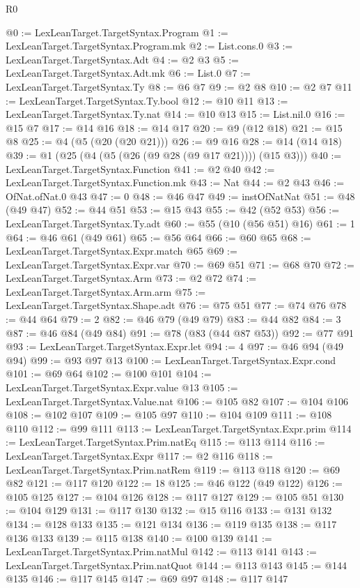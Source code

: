\begin{lexlean}{R0}
\begin{coremodule}
@0 := LexLeanTarget.TargetSyntax.Program
@1 := LexLeanTarget.TargetSyntax.Program.mk
@2 := List.cons.{0}
@3 := LexLeanTarget.TargetSyntax.Adt
@4 := @2 @3
@5 := LexLeanTarget.TargetSyntax.Adt.mk
@6 := List.{0}
@7 := LexLeanTarget.TargetSyntax.Ty
@8 := @6 @7
@9 := @2 @8
@10 := @2 @7
@11 := LexLeanTarget.TargetSyntax.Ty.bool
@12 := @10 @11
@13 := LexLeanTarget.TargetSyntax.Ty.nat
@14 := @10 @13
@15 := List.nil.{0}
@16 := @15 @7
@17 := @14 @16
@18 := @14 @17
@20 := @9 (@12 @18)
@21 := @15 @8
@25 := @4 (@5 (@20 (@20 @21)))
@26 := @9 @16
@28 := @14 (@14 @18)
@39 := @1 (@25 (@4 (@5 (@26 (@9 @28 (@9 @17 @21)))) (@15 @3)))
@40 := LexLeanTarget.TargetSyntax.Function
@41 := @2 @40
@42 := LexLeanTarget.TargetSyntax.Function.mk
@43 := Nat
@44 := @2 @43
@46 := OfNat.ofNat.{0} @43
@47 := 0
@48 := @46 @47
@49 := instOfNatNat
@51 := @48 (@49 @47)
@52 := @44 @51
@53 := @15 @43
@55 := @42 (@52 @53)
@56 := LexLeanTarget.TargetSyntax.Ty.adt
@60 := @55 (@10 (@56 @51) @16)
@61 := 1
@64 := @46 @61 (@49 @61)
@65 := @56 @64
@66 := @60 @65
@68 := LexLeanTarget.TargetSyntax.Expr.match @65
@69 := LexLeanTarget.TargetSyntax.Expr.var
@70 := @69 @51
@71 := @68 @70
@72 := LexLeanTarget.TargetSyntax.Arm
@73 := @2 @72
@74 := LexLeanTarget.TargetSyntax.Arm.arm
@75 := LexLeanTarget.TargetSyntax.Shape.adt
@76 := @75 @51
@77 := @74 @76
@78 := @44 @64
@79 := 2
@82 := @46 @79 (@49 @79)
@83 := @44 @82
@84 := 3
@87 := @46 @84 (@49 @84)
@91 := @78 (@83 (@44 @87 @53))
@92 := @77 @91
@93 := LexLeanTarget.TargetSyntax.Expr.let
@94 := 4
@97 := @46 @94 (@49 @94)
@99 := @93 @97 @13
@100 := LexLeanTarget.TargetSyntax.Expr.cond
@101 := @69 @64
@102 := @100 @101
@104 := LexLeanTarget.TargetSyntax.Expr.value @13
@105 := LexLeanTarget.TargetSyntax.Value.nat
@106 := @105 @82
@107 := @104 @106
@108 := @102 @107
@109 := @105 @97
@110 := @104 @109
@111 := @108 @110
@112 := @99 @111
@113 := LexLeanTarget.TargetSyntax.Expr.prim
@114 := LexLeanTarget.TargetSyntax.Prim.natEq
@115 := @113 @114
@116 := LexLeanTarget.TargetSyntax.Expr
@117 := @2 @116
@118 := LexLeanTarget.TargetSyntax.Prim.natRem
@119 := @113 @118
@120 := @69 @82
@121 := @117 @120
@122 := 18
@125 := @46 @122 (@49 @122)
@126 := @105 @125
@127 := @104 @126
@128 := @117 @127
@129 := @105 @51
@130 := @104 @129
@131 := @117 @130
@132 := @15 @116
@133 := @131 @132
@134 := @128 @133
@135 := @121 @134
@136 := @119 @135
@138 := @117 @136 @133
@139 := @115 @138
@140 := @100 @139
@141 := LexLeanTarget.TargetSyntax.Prim.natMul
@142 := @113 @141
@143 := LexLeanTarget.TargetSyntax.Prim.natQuot
@144 := @113 @143
@145 := @144 @135
@146 := @117 @145
@147 := @69 @97
@148 := @117 @147

\end{coremodule}
\end{lexlean}

